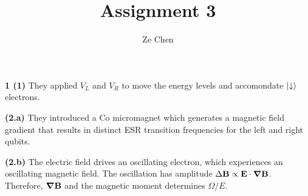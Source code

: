 \documentclass{article}
\title{Assignment 3}
\author{Ze Chen}
\makeatletter
\newcommand*{\shifttext}[1]{%
  \settowidth{\@tempdima}{#1}%
  \hspace{-\@tempdima}#1%
}
\newcommand{\plabel}[1]{%
\shifttext{\textbf{#1}\quad}%
}
\makeatother
\begin{document}
\maketitle

\plabel{1 (1)}%
They applied $V_L$ and $V_R$ to move the energy levels and accomondate $\ket{\downarrow}$ electrons.
\begin{center}
\end{center}
\begin{center}
\end{center}

\plabel{(2.a)}%
They introduced a Co micromagnet which generates a magnetic field gradient that results in distinct ESR transition frequencies for the left and right qubits.

\plabel{(2.b)}%
The electric field drives an oscillating electron, which experiences an oscillating magnetic field.
The oscillation has amplitude $\Delta \vb{B} \propto \vb{E}\cdot \grad \vb{B}$.
Therefore, $\grad \vb{B}$ and the magnetic moment determines $\Omega/E$.
\end{document}
